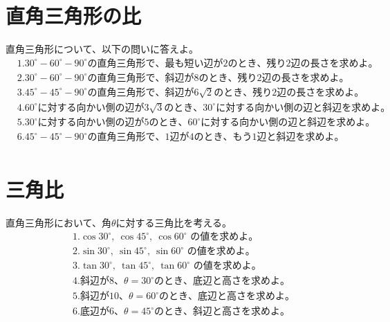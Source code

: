 \documentclass[paper=b4j,landscape,twocolumn,fleqn]{jlreq}
\begin{document}
\section{直角三角形の比}
直角三角形について、以下の問いに答えよ。
\begin{align*}
　&1.　30^\circ-60^\circ-90^\circ の直角三角形で、最も短い辺が2のとき、残り2辺の長さを求めよ。\\[0.45em]
　&2.　30^\circ-60^\circ-90^\circ の直角三角形で、斜辺が8のとき、残り2辺の長さを求めよ。\\[0.45em]
　&3.　45^\circ-45^\circ-90^\circ の直角三角形で、斜辺が6\sqrt{2}のとき、残り2辺の長さを求めよ。\\[0.45em]
　&4.　60^\circ に対する向かい側の辺が3\sqrt{3}のとき、30^\circ に対する向かい側の辺と斜辺を求めよ。\\[0.45em]
　&5.　30^\circ に対する向かい側の辺が5のとき、60^\circ に対する向かい側の辺と斜辺を求めよ。\\[0.45em]
　&6.　45^\circ-45^\circ-90^\circ の直角三角形で、1辺が4のとき、もう1辺と斜辺を求めよ。\\[0.45em]
\end{align*}

\section{三角比}
直角三角形において、角$\theta$に対する三角比を考える。
\begin{align*}
　&1.　\cos 30^\circ,\ \cos 45^\circ,\ \cos 60^\circ\text{ の値を求めよ。}\\[0.45em]
　&2.　\sin 30^\circ,\ \sin 45^\circ,\ \sin 60^\circ\text{ の値を求めよ。}\\[0.45em]
　&3.　\tan 30^\circ,\ \tan 45^\circ,\ \tan 60^\circ\text{ の値を求めよ。}\\[0.45em]
　&4.　斜辺が8、\theta=30^\circ のとき、底辺と高さを求めよ。\\[0.45em]
　&5.　斜辺が10、\theta=60^\circ のとき、底辺と高さを求めよ。\\[0.45em]
　&6.　底辺が6、\theta=45^\circ のとき、斜辺と高さを求めよ。\\[0.45em]
\end{align*}
\end{document}
